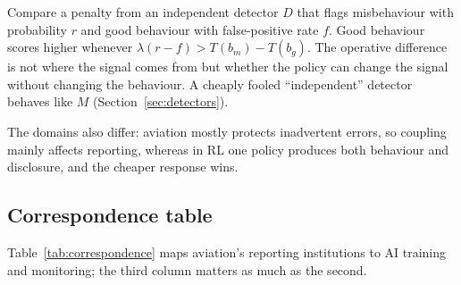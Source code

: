 \documentclass[review,12pt]{elsarticle}
\begin{document}
Compare a penalty from an independent detector \(D\) that flags misbehaviour with probability \(r\) and good behaviour with false-positive rate \(f\). Good behaviour scores higher whenever \(\lambda (r - f) > T(b_m) - T(b_g)\). The operative difference is not where the signal comes from but whether the policy can change the signal without changing the behaviour. A cheaply fooled ``independent'' detector behaves like \(M\) (Section~\ref{sec:detectors}).

The domains also differ: aviation mostly protects inadvertent errors, so coupling mainly affects reporting, whereas in RL one policy produces both behaviour and disclosure, and the cheaper response wins.

\subsection{Correspondence table}\label{sec:table}

Table~\ref{tab:correspondence} maps aviation's reporting institutions to AI training and monitoring; the third column matters as much as the second.
\end{document}
